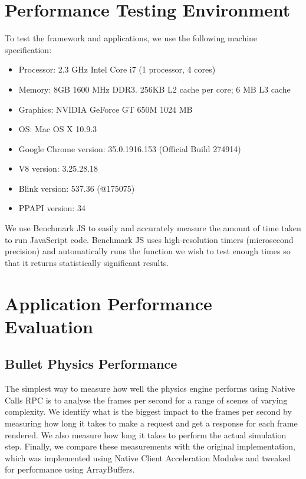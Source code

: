 \section{Performance Testing Environment} %
\label{sec:performance_testing_environment}
To test the framework and applications, we use the following machine specification:
\begin{itemize}
  \item Processor: 2.3 GHz Intel Core i7 (1 processor, 4 cores)
  \item Memory: 8GB 1600 MHz DDR3. 256KB L2 cache per core; 6 MB L3 cache
  \item Graphics: NVIDIA GeForce GT 650M 1024 MB
  \item OS: Mac OS X 10.9.3
  \item Google Chrome version: 35.0.1916.153 (Official Build 274914) 
  \item V8 version: 3.25.28.18
  \item Blink version: 537.36 (@175075)
  \item PPAPI version: 34
\end{itemize}

We use Benchmark JS\cite{benchmarkjs} to easily and accurately measure the amount of time taken to run JavaScript code. Benchmark JS uses high-resolution timers (microsecond precision) and automatically runs the function we wish to test enough times so that it returns statistically significant results. 

\section{Application Performance Evaluation} %
\label{sec:application_performance_evaluation}
\subsection{Bullet Physics Performance} %
\label{sub:bullet_physics_performance}
The simplest way to measure how well the physics engine performs using Native Calls RPC is to analyse the frames per second for a range of scenes of varying complexity. We identify what is the biggest impact to the frames per second by measuring how long it takes to make a request and get a response for each frame rendered. We also measure how long it takes to perform the actual simulation step. Finally, we compare these measurements with the original implementation, which was implemented using Native Client Acceleration Modules and tweaked for performance using ArrayBuffers.

